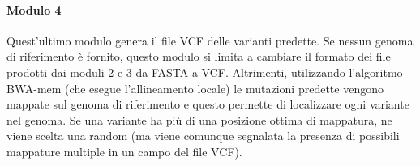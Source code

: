 \documentclass[../main.tex]{subfiles}
\begin{document}
\paragraph{Modulo 4} Quest'ultimo modulo genera il file VCF delle varianti predette. Se nessun genoma di riferimento è fornito, questo modulo si limita a cambiare il formato dei file prodotti dai moduli 2 e 3 da FASTA a VCF. Altrimenti, utilizzando l'algoritmo BWA-mem (che esegue l'allineamento locale) le mutazioni predette vengono mappate sul genoma di riferimento e questo permette di localizzare ogni variante nel genoma. Se una variante ha più di una posizione ottima di mappatura, ne viene scelta una random (ma viene comunque segnalata la presenza di possibili mappature multiple in un campo del file VCF).
\end{document}
